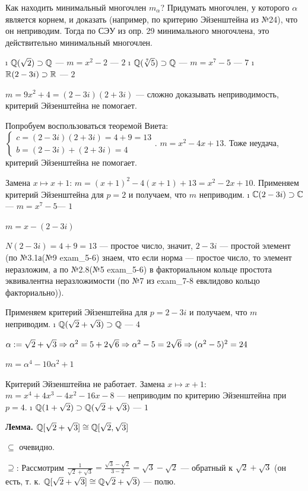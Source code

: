 \begin{solution}
Как находить минимальный многочлен $m_\alpha$? Придумать многочлен, у которого $\alpha$ является корнем, и доказать (например, по критерию Эйзенштейна из №24), что он неприводим. Тогда по СЭУ из опр. 29 минимального многочлена, это действительно минимальный многочлен.
\begin{itemize}
\tightlist
\i
  \(\mathbb{Q}(\sqrt2) \supset \mathbb{Q}\) --- $m = x^2-2$ --- \(2\)
\i
  \(\mathbb{Q}(\sqrt[7]{5}) \supset \mathbb{Q}\) --- $m = x^7-5$ --- \(7\)
\i
  \(\mathbb{R}(2-3i) \supset \mathbb{R}\) --- \(2\)
  
  $m = 9x^2+4 = (2-3i)(2+3i)$ --- сложно доказывать неприводимость, критерий Эйзенштейна не помогает.
  
  Попробуем воспользоваться теоремой Виета: $\begin{cases} c=(2-3i)(2+3i)=4+9=13 \\ b=(2-3i)+(2+3i)=4 \end{cases}$. $m = x^2-4x+13$. Тоже неудача, критерий Эйзенштейна не помогает.
  
  Замена $x \mapsto x+1$: $m = (x+1)^2-4(x+1)+13 = x^2-2x+10$.
  Применяем критерий Эйзенштейна для $p=2$ и получаем, что $m$ неприводим.
\i
  \(\mathbb{C}(2-3i) \supset \mathbb{C}\) --- $m = x^7-5$--- \(1\)
  
  $m=x-(2-3i)$
  
  $N(2-3i) = 4+9=13$ --- простое число, значит, $2-3i$ --- простой элемент (по №3.1а(№9 exam\_5-6) знаем, что если норма --- простое число, то элемент неразложим, а по №2.8(№5 exam\_5-6) в факториальном кольце простота эквивалентна неразложимости (по №7 из exam\_7-8 евклидово кольцо факториально)).
  
  Применяем критерий Эйзенштейна для $p=2-3i$ и получаем, что $m$ неприводим.
\i
  \(\mathbb{Q}(\sqrt2+\sqrt{3}) \supset \mathbb{Q}\) --- \(4\)
  
  $\alpha := \sqrt2+\sqrt{3} \Rightarrow \alpha^2 = 5+2\sqrt6 \Rightarrow \alpha^2-5=2\sqrt6 \Rightarrow (\alpha^2-5)^2 = 24$
  
  $m = \alpha^4-10\alpha^2+1$ 
  
  Критерий Эйзенштейна не работает. Замена $x \mapsto x+1$: $m = x^4+4x^3-4x^2-16x-8$ --- неприводим по критерию Эйзенштейна при $p=4$.
\i
  \(\mathbb{Q}(1+\sqrt2) \supset \mathbb{Q}(\sqrt2+\sqrt{3})\) --- \(1\)
  
  \bf{Лемма.} $\mathbb{Q}[\sqrt2+\sqrt3] \cong \mathbb{Q}[\sqrt2, \sqrt3]$
  \begin{solution}
	$\subseteq$ очевидно.
	
	$\supseteq$: Рассмотрим $\frac{1}{\sqrt2+\sqrt3} = \frac{\sqrt3-\sqrt2}{3-2} = \sqrt3-\sqrt2$ --- обратный к $\sqrt2+\sqrt3$ (он есть, т. к. $\mathbb{Q}[\sqrt2+\sqrt3] \cong \mathbb{Q}\sqrt2+\sqrt3)$ --- полю.
	

\end{solution}
\end{itemize}
\end{solution}
